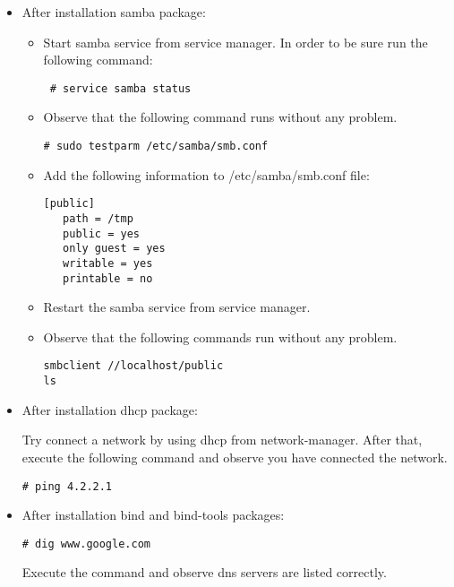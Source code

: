 \documentclass[a4paper,10pt]{article}
\begin{document}
\begin{itemize}
\item After installation samba package:
\begin{itemize}

\item Start samba service from service manager. In order to be sure run the following command:

\begin{verbatim}
 # service samba status 
\end{verbatim}

\item Observe that the following command runs without any problem.
\begin{verbatim}
# sudo testparm /etc/samba/smb.conf
\end{verbatim}

\item Add the following information to /etc/samba/smb.conf file:
\begin{verbatim}
[public]
   path = /tmp
   public = yes
   only guest = yes
   writable = yes
   printable = no
\end{verbatim}

\item Restart the samba service from service manager.

\item Observe that the following commands run without any problem.
\begin{verbatim}
smbclient //localhost/public 
ls
\end{verbatim}

\end{itemize}
 \item After installation dhcp package:

Try connect a network by using dhcp from network-manager. After that, execute the following command and observe you have connected the network.
\begin{verbatim}
# ping 4.2.2.1
\end{verbatim}

\item After installation bind and bind-tools packages:
\begin{verbatim}
# dig www.google.com
\end{verbatim}
Execute the command and observe dns servers are listed correctly.

\end{itemize}
\end{document}
